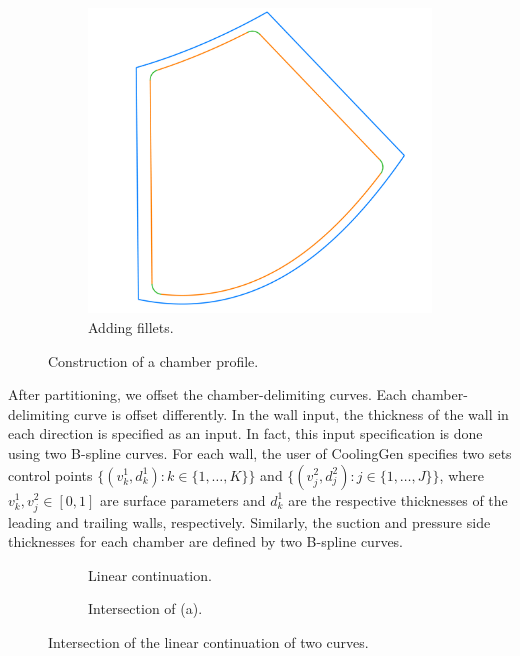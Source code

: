 \documentclass[a4paper, 11pt]{report}
\theoremstyle{definition}
\begin{document}
\begin{figure}[H]
\begin{subfigure}{.32\textwidth}
		\end{subfigure}
		\begin{subfigure}{.32\textwidth}
			\includegraphics[width=\textwidth]{../tec/chambers/83.png}
			\caption{Adding fillets.}
		\end{subfigure}
		\caption{Construction of a chamber profile.}
		\label{fig:chamber_shrinking}
	\end{figure}

	After partitioning, we offset the chamber-delimiting curves. Each chamber-delimiting curve is offset differently. In the wall input, the thickness of the wall in each direction is specified as an input. In fact, this input specification is done using two B-spline curves. For each wall, the user of CoolingGen specifies two sets control points $\{(v^1_k, d^1_k) : k \in \{1, \ldots, K\}\}$ and $\{(v^2_j, d^2_j) : j \in \{1, \ldots, J\}\}$, where $v^1_k, v^2_j \in [0,1]$ are surface parameters and $d^1_k$ are the respective thicknesses of the leading and trailing walls, respectively. Similarly, the suction and pressure side thicknesses for each chamber are defined by two B-spline curves.

	\begin{figure}[H]
		\centering
		\begin{subfigure}{0.28\textwidth}
			\centering
			
			\caption{Linear continuation.}
		\end{subfigure}
		\begin{subfigure}{0.28\textwidth}
			\centering
			
			\caption{Intersection of (a).}
		\end{subfigure}
		\caption{Intersection of the linear continuation of two curves.}
		\label{fig:linear_continuation_curve}
	\end{figure}
\end{document}
